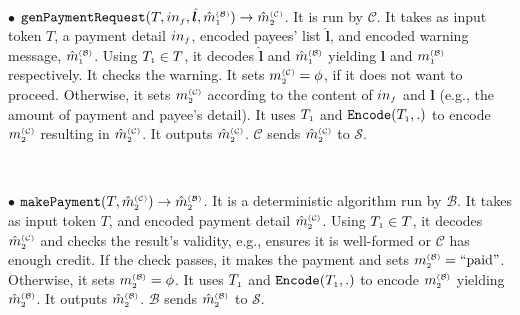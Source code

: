 \begin{definition}
\

\item  [$\bullet$] $\mathtt{genPaymentRequest}(T, in_{\scriptscriptstyle f}, \hat{\bm{l}}, \hat m^{\scriptscriptstyle\mathcal{(B)}}_{\scriptscriptstyle1})\rightarrow \hat m^{\scriptscriptstyle\mathcal{(C)}}_{\scriptscriptstyle2}$. It is  run by $\mathcal{C}$. It takes as input token $T$, a payment detail $in_{\scriptscriptstyle f}$, encoded payees' list $\hat{\bm{l}}$, and encoded warning message,  $\hat m^{\scriptscriptstyle\mathcal{(B)}}_{\scriptscriptstyle1}$. Using $T_{\scriptscriptstyle 1}\in T$, it decodes  $\hat{\bm{l}}$ and $\hat m^{\scriptscriptstyle\mathcal{(B)}}_{\scriptscriptstyle1}$ yielding ${\bm{l}}$ and $m^{\scriptscriptstyle\mathcal{(B)}}_{\scriptscriptstyle1}$ respectively. It checks the warning.  It sets   $m^{\scriptscriptstyle\mathcal{(C)}}_{\scriptscriptstyle2}=\phi$, if it does not want to proceed. Otherwise, it  sets $m^{\scriptscriptstyle\mathcal{(C)}}_{\scriptscriptstyle2}$ according to the content of $in_{\scriptscriptstyle f}$ and  ${\bm{l}}$ (e.g., the amount of payment and payee's detail). It uses $T_{\scriptscriptstyle 1}$ and  $\mathtt{Encode}(T_{\scriptscriptstyle 1}, .)$ to encode $m^{\scriptscriptstyle\mathcal{(C)}}_{\scriptscriptstyle2}$ resulting in $\hat m^{\scriptscriptstyle\mathcal{(C)}}_{\scriptscriptstyle2}$. It outputs $\hat m^{\scriptscriptstyle\mathcal{(C)}}_{\scriptscriptstyle2}$. $\mathcal{C}$ sends $\hat m^{\scriptscriptstyle\mathcal{(C)}}_{\scriptscriptstyle2}$ to $\mathcal{S}$. 
%

\

\item  [$\bullet$] $\mathtt{makePayment}(T, \hat m^{\scriptscriptstyle\mathcal{(C)}}_{\scriptscriptstyle2})\rightarrow \hat m^{\scriptscriptstyle\mathcal{(B)}}_{\scriptscriptstyle2}$. It is a deterministic algorithm run by $\mathcal{B}$. It takes as input token $T$,  and encoded payment  detail $\hat m^{\scriptscriptstyle\mathcal{(C)}}_{\scriptscriptstyle2}$. Using $T_{\scriptscriptstyle 1}\in T$, it decodes $\hat m^{\scriptscriptstyle\mathcal{(C)}}_{\scriptscriptstyle2}$ and  checks the result's validity, e.g., ensures it is well-formed or $\mathcal{C}$ has enough credit. If the check  passes,  it makes the payment and  sets $m^{\scriptscriptstyle\mathcal{(B)}}_{\scriptscriptstyle2}=\text{``paid''}$. Otherwise, it sets $m^{\scriptscriptstyle\mathcal{(B)}}_{\scriptscriptstyle2}=\phi$. It uses $T_{\scriptscriptstyle 1}$ and  $\mathtt{Encode}(T_{\scriptscriptstyle 1}, .)$ to encode $m^{\scriptscriptstyle\mathcal{(B)}}_{\scriptscriptstyle2}$ yielding $\hat m^{\scriptscriptstyle\mathcal{(B)}}_{\scriptscriptstyle2}$. It outputs $\hat m^{\scriptscriptstyle\mathcal{(B)}}_{\scriptscriptstyle2}$. $\mathcal{B}$ sends $\hat m^{\scriptscriptstyle\mathcal{(B)}}_{\scriptscriptstyle2}$ to $\mathcal{S}$.
%

\


\end{definition}

